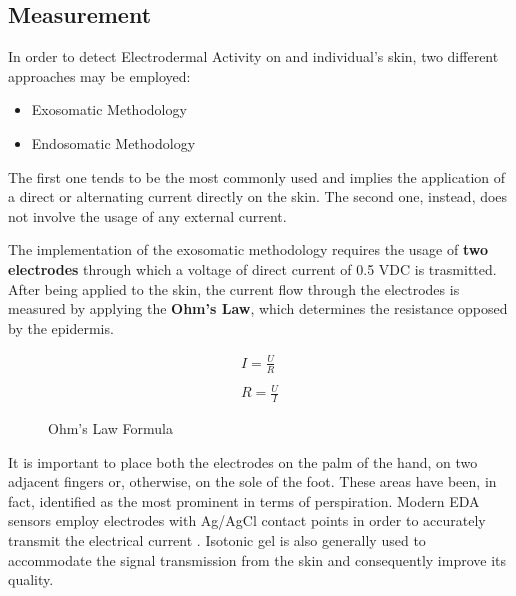 \subsection{Measurement}\label{subsec:eda-measurement}


In order to detect Electrodermal Activity on and individual's skin, two different approaches may be employed:

\begin{itemize}
    \item Exosomatic Methodology
    \item Endosomatic Methodology
\end{itemize}

The first one tends to be the most commonly used and implies the application of a direct or alternating current directly on the skin. The second one, instead, does not involve the usage of any external current.

The implementation of the exosomatic methodology requires the usage of \textbf{two electrodes} through which a voltage of direct current of 0.5 VDC is trasmitted. After being applied to the skin, the current flow through the electrodes is measured by applying the \textbf{Ohm's Law}, which determines the resistance opposed by the epidermis.

\begin{figure}[h]
    \begin{equation}
    \begin{aligned}
    I = \frac{U}{R} \\
    \\
    R = \frac{U}{I}
    \end{aligned}
    \end{equation}
    \caption{Ohm's Law Formula}
    \label{fig:ohmlaw}
\end{figure}

It is important to place both the electrodes on the palm of the hand, on two adjacent fingers or, otherwise, on the sole of the foot. These areas have been, in fact, identified as the most prominent in terms of perspiration. Modern EDA sensors employ electrodes with Ag/AgCl contact points in order to accurately transmit the electrical current \cite{eda-imotions}. Isotonic gel is also generally used to accommodate the signal transmission from the skin and consequently improve its quality.

